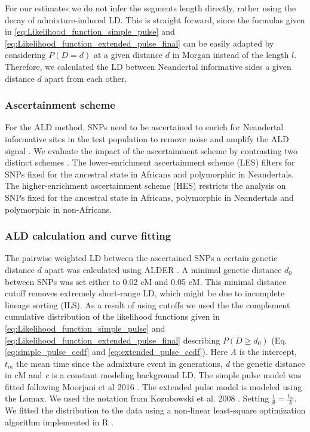 \documentclass[]{article}
\begin{document}
For our estimates we do not infer the segments length directly, rather using the decay of admixture-induced LD. This is straight forward, since the formulas given in \ref{eq:Likelihood_function_simple_pulse} and \ref{eq:Likelihood_function_extended_pulse_final} can be easily adapted by considering $P(D=d)$ at a given distance $d$ in Morgan instead of the length $l$. Therefore, we calculated the LD between Neandertal informative sides a given distance $d$ apart from each other.

\subsubsection{Ascertainment scheme}\label{asceteinment scheme}

For the ALD method, SNPs need to be ascertained to enrich for
Neandertal informative sites in the test population to remove noise and
amplify the ALD signal \citep{sankararaman_date_2012}. 
We evaluate the impact of the ascertainment scheme by contrasting two distinct schemes \citep{sankararaman_date_2012,fu_genome_2014}. The lower-enrichment
ascertainment scheme (LES) filters for SNPs fixed for the ancestral state in
Africans and polymorphic in Neandertals. The higher-enrichment
ascertainment scheme (HES) restricts the analysis on SNPs fixed for the
ancestral state in Africans, polymorphic in Neandertals and polymorphic
in non-Africans.

\subsubsection{ALD calculation and curve fitting}\label{ALD calculation and curve fitting}

The pairwise weighted LD between the ascertained SNPs a certain genetic
distance \(d\) apart was calculated using ALDER
\citep{loh_inferring_2013}. A minimal genetic distance \(d_0\) between
SNPs was set either to 0.02 cM and 0.05 cM. This minimal distance cutoff
removes extremely short-range LD, which might be due to incomplete lineage sorting (ILS). As a result of using cutoffs we used the the complement cumulative distribution of the likelihood functions given in \ref{eq:Likelihood_function_simple_pulse} and \ref{eq:Likelihood_function_extended_pulse_final} describing $P(D \geq d_0)$ (Eq. \ref{eq:simple_pulse_ccdf} and \ref{eq:extended_pulse_ccdf}). Here \emph{A} is the
intercept, $t_m$ the mean time since the admixture event in generations,
\emph{d} the genetic distance in cM and \emph{c} is a constant modeling
background LD. The simple pulse model was fitted following Moorjani et al 2016
\citep{moorjani_genetic_2016}. The extended pulse model is
modeled using the Lomax. We used the
notation from Kozubowski et al. 2008 \citep{Kozubowski_Testing_2008}. Setting $\frac{1}{\theta} = \frac{t_m}{k}$. We fitted the distribution to the data using a non-linear least-square optimization algorithm
implemented in R \citep{R_Core_Team_2019}.
\end{document}
